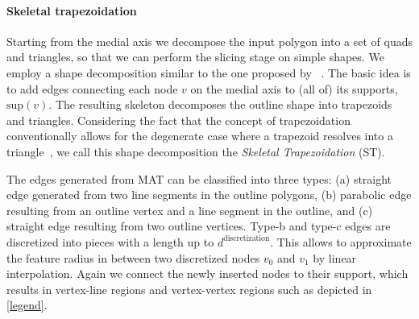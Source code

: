 \paragraph{Skeletal trapezoidation}
Starting from the medial axis we decompose the input polygon into a set of quads and triangles, so that we can perform the slicing stage on simple shapes.
We employ a shape decomposition similar to the one proposed by \citeauthor{Ding2016a}~\cite{Ding2016a}. 
The basic idea is to add edges connecting each node $v$ on the medial axis to (all of) its supports, $\text{sup}(v)$. 
The resulting skeleton decomposes the outline shape into trapezoids and triangles.
Considering the fact that the concept of trapezoidation conventionally allows for the degenerate case where a trapezoid resolves into a triangle~\cite{chazelle1984,fournier1984}, we call this shape decomposition the \emph{Skeletal Trapezoidation} (ST).


The edges generated from MAT can be classified into three types: (a) straight edge generated from two line segments in the outline polygons, (b) parabolic edge resulting from an outline vertex and a line segment in the outline, and (c) straight edge resulting from two outline vertices.
Type-b and type-c edges are discretized into pieces with a length up to $d^\text{discretization}$.
This allows to approximate the feature radius in between two discretized nodes $v_0$ and $v_1$ by linear interpolation. 
Again we connect the newly inserted nodes to their support, which results in vertex-line regions and vertex-vertex regions such as depicted in \cref{legend}.






